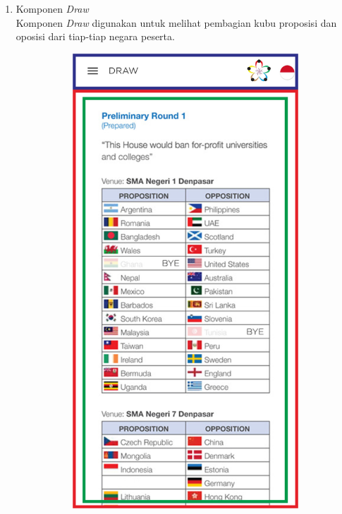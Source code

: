\begin{enumerate}
\begin{enumerate}
\begin{itemize}
	\end{itemize}
	\end{enumerate}
	\item Komponen \textit{Draw} \\
	Komponen \textit{Draw} digunakan untuk melihat pembagian kubu proposisi dan oposisi dari tiap-tiap negara peserta.
	\begin{figure}[H]
    	\centering
     	\begin{subfigure}[b]{0.43\textwidth}
        	\centering
         	\includegraphics[scale=0.465]{Gambar/DrawPageWireframe.png}

\end{subfigure}
\end{figure}
\end{enumerate}
